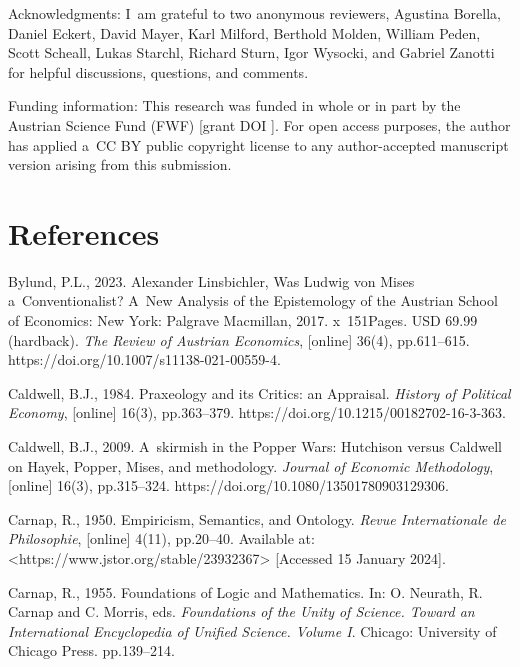 Acknowledgments: I~am grateful to two anonymous reviewers, Agustina Borella, Daniel Eckert, David Mayer, Karl Milford, Berthold Molden, William Peden, Scott Scheall, Lukas Starchl, Richard Sturn, Igor Wysocki, and Gabriel Zanotti for helpful discussions, questions, and comments.



Funding information: This research was funded in whole or in part by the Austrian Science Fund (FWF) [grant DOI ]. For open access purposes, the author has applied a~CC BY public copyright license to any author-accepted manuscript version arising from this submission.



\section{References}

Bylund, P.L., 2023. Alexander Linsbichler, Was Ludwig von Mises a~Conventionalist? A~New Analysis of the Epistemology of the Austrian School of Economics: New York: Palgrave Macmillan, 2017. x~151Pages. USD 69.99 (hardback). \textit{The Review of Austrian Economics}, [online] 36(4), pp.611–615. https://doi.org/10.1007/s11138-021-00559-4.



Caldwell, B.J., 1984. Praxeology and its Critics: an Appraisal. \textit{History of Political Economy}, [online] 16(3), pp.363–379. https://doi.org/10.1215/00182702-16-3-363.



Caldwell, B.J., 2009. A~skirmish in the Popper Wars: Hutchison versus Caldwell on Hayek, Popper, Mises, and methodology. \textit{Journal of Economic Methodology}, [online] 16(3), pp.315–324. https://doi.org/10.1080/13501780903129306.



Carnap, R., 1950. Empiricism, Semantics, and Ontology. \textit{Revue Internationale de Philosophie}, [online] 4(11), pp.20–40. Available at: {\textless}https://www.jstor.org/stable/23932367{\textgreater} [Accessed 15 January 2024].



Carnap, R., 1955. Foundations of Logic and Mathematics. In: O. Neurath, R. Carnap and C. Morris, eds. \textit{Foundations of the Unity of Science. Toward an International Encyclopedia of Unified Science. Volume I}. Chicago: University of Chicago Press. pp.139–214.




